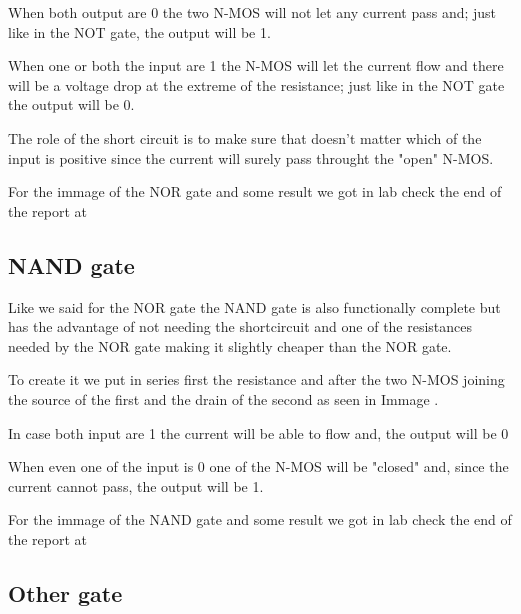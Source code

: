 \documentclass{article}
\begin{document}
\vspace{3mm} %

When both output are 0 the two N-MOS will not let any current pass and; just like in the NOT gate, the output will be 1.

When one or both the input are 1 the N-MOS will let the current flow and there will be a voltage drop at the extreme of the resistance; just like in the NOT gate the output will be 0.

The role of the short circuit is to make sure that doesn't matter which of the input is positive since the current will surely pass throught the "open" N-MOS.

\vspace{3mm}

For the immage of the NOR gate and some result we got in lab check the end of the report at %

\subsection{NAND gate}

Like we said for the NOR gate the NAND gate is also functionally complete but has the advantage of not needing the shortcircuit and one of the resistances needed by the NOR gate making it slightly cheaper than the NOR gate. 

To create it we put in series first the resistance and after the two N-MOS joining the source of the first and the drain of the second as seen in Immage%
.

\vspace{3mm} %

In case both input are 1 the current will be able to flow and, the output will be 0

When even one of the input is 0 one of the N-MOS will be "closed" and, since the current cannot pass, the output will be 1.

\vspace{3mm}

For the immage of the NAND gate and some result we got in lab check the end of the report at %



\subsection{Other gate}
\end{document}
